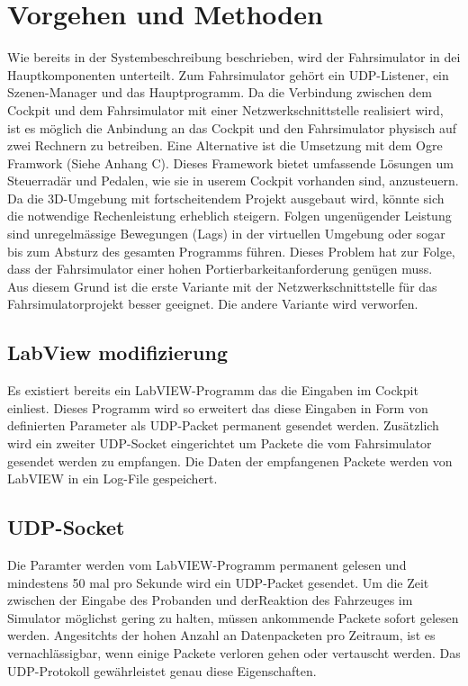 \section{Vorgehen und Methoden}
Wie bereits in der Systembeschreibung beschrieben, wird der Fahrsimulator in dei Hauptkomponenten unterteilt. Zum Fahrsimulator gehört ein UDP-Listener, ein Szenen-Manager und das Hauptprogramm. Da die Verbindung zwischen dem Cockpit und dem Fahrsimulator mit einer Netzwerkschnittstelle realisiert wird, ist es möglich die Anbindung an das Cockpit und den Fahrsimulator physisch auf zwei Rechnern zu betreiben. Eine Alternative ist die Umsetzung mit dem Ogre Framwork (Siehe Anhang C). Dieses Framework bietet umfassende Lösungen um Steuerradär und Pedalen, wie sie in userem Cockpit vorhanden sind, anzusteuern.\\
Da die 3D-Umgebung mit fortscheitendem Projekt ausgebaut wird, könnte sich die notwendige Rechenleistung erheblich steigern. Folgen ungenügender Leistung sind unregelmässige Bewegungen (Lags) in der virtuellen Umgebung oder sogar bis zum Absturz des gesamten Programms führen. Dieses Problem hat zur Folge, dass der Fahrsimulator einer hohen Portierbarkeitanforderung genügen muss. \\
Aus diesem Grund ist die erste Variante mit der Netzwerkschnittstelle für das Fahrsimulatorprojekt besser geeignet. Die andere Variante wird verworfen.
\subsection{LabView modifizierung}
Es existiert bereits ein LabVIEW-Programm das die Eingaben im Cockpit einliest. Dieses Programm wird so erweitert das diese Eingaben in Form von definierten Parameter als UDP-Packet permanent gesendet werden. Zusätzlich wird ein zweiter UDP-Socket eingerichtet um Packete die vom Fahrsimulator gesendet werden zu empfangen. Die Daten der empfangenen Packete werden von LabVIEW in ein Log-File gespeichert. 
\subsection{UDP-Socket}
Die Paramter werden vom LabVIEW-Programm permanent gelesen und mindestens 50 mal pro Sekunde wird ein UDP-Packet gesendet. Um die Zeit zwischen der Eingabe des Probanden und derReaktion des Fahrzeuges im Simulator möglichst gering zu halten, müssen ankommende Packete sofort gelesen werden. Angesitchts der hohen Anzahl an Datenpacketen pro Zeitraum, ist es vernachlässigbar, wenn einige Packete verloren gehen oder vertauscht werden. Das UDP-Protokoll gewährleistet genau diese Eigenschaften. \\

